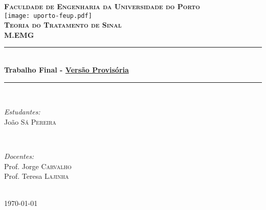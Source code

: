 \begin{titlepage}

    \newcommand{\HRule}{\rule{\linewidth}{0.4mm}} %
    
    \center      


    \textbf{\textsc{\Large Faculdade de Engenharia da Universidade do Porto}\\[2.5cm]}
    \texttt{[image: uporto-feup.pdf]}\\[2cm] 
    \textsc{\Large \bfseries Teoria do Tratamento de Sinal}\\[0.5cm] %
    \textsc{\large \bfseries M.EMG}\\[1cm] %
    
    
    \HRule \\[0.4cm]
    { \LARGE{\bfseries Trabalho Final - \underline{Versão Provisória}}}\\[0.4cm] %
    \HRule \\[2cm]


    \begin{minipage}{0.4\textwidth}
        \begin{flushleft} \large
        \emph{Estudantes:}\\
        João \textsc{Sá Pereira} %
        \end{flushleft}
        \end{minipage}
        ~
        \begin{minipage}{0.4\textwidth}
        \begin{flushright} \large
        \emph{Docentes:} \\
        Prof. Jorge \textsc{Carvalho} \\
        Prof. Teresa \textsc{Lajinha} %
        \end{flushright}
        \end{minipage}\\[2.5cm]
    
    
    \vfill
    {\large \today}\\[1cm]

 

        

    \end{titlepage}
